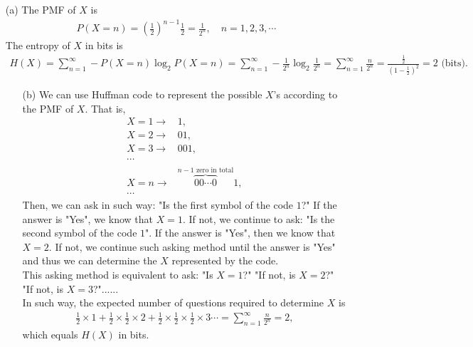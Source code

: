 \documentclass{assignment}
\begin{document}
\begin{sol}
    \begin{itemize}
        \item[(a)] The PMF of $X$ is
        \begin{align}
            P(X=n)=\left(\frac{1}{2}\right)^{n-1}\frac{1}{2}=\frac{1}{2^n},\quad n=1,2,3,\cdots
        \end{align}
        The entropy of $X$ in bits is
        \begin{align}
            H(X)=\sum_{n=1}^{\infty}-P(X=n)\log_2P(X=n)=\sum_{n=1}^{\infty}-\frac{1}{2^n}\log_2\frac{1}{2^n}=\sum_{n=1}^{\infty}\frac{n}{2^n}=\frac{\frac{1}{2}}{\left(1-\frac{1}{2}\right)^2}=2\text{ (bits)}.
        \end{align}
        \begin{itemize}
            \item[(b)] We can use Huffman code to represent the possible $X$'s according to the PMF of $X$. That is,
            \begin{align*}
                X=1\rightarrow&1,\\
                X=2\rightarrow&01,\\
                X=3\rightarrow&001,\\
                \cdots&\\
                X=n\rightarrow&\overbrace{00\cdots 0}^{n-1\text{ zero in total}}1,\\
                \cdots&
            \end{align*}
            Then, we can ask in such way: "Is the first symbol of the code $1$?" If the answer is "Yes", we know that $X=1$. If not, we continue to ask: "Is the second symbol of the code $1$". If the answer is "Yes", then we know that $X=2$. If not, we continue such asking method until the answer is "Yes" and thus we can determine the $X$ represented by the code.\\
            This asking method is equivalent to ask: "Is $X=1$?" "If not, is $X=2$?" "If not, is $X=3$?"......\\
            In such way, the expected number of questions required to determine $X$ is
            \begin{align}
                \frac{1}{2}\times 1+\frac{1}{2}\times\frac{1}{2}\times 2+\frac{1}{2}\times\frac{1}{2}\times\frac{1}{2}\times 3\cdots=\sum_{n=1}^{\infty}\frac{n}{2^n}=2,
            \end{align}
            which equals $H(X)$ in bits.
        \end{itemize}
    \end{itemize}
\end{sol}
\end{document}
